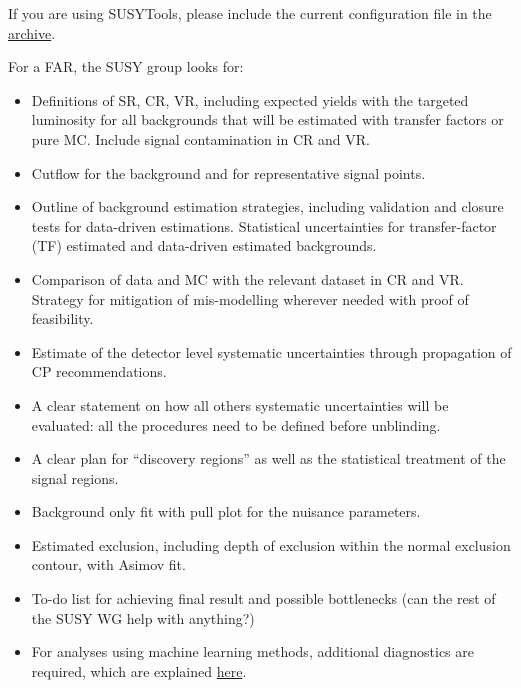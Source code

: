 If you are using SUSYTools, please include the current configuration file in the \href{http://gitlab.cern.ch/atlas-phys-susy-wg/AnalysisSUSYToolsConfigurations}{archive}.

For a FAR, the SUSY group looks for:
\begin{itemize}
\item Definitions of SR, CR, VR, including expected yields with the targeted luminosity for all backgrounds that will be estimated with transfer factors or pure MC\@.
    Include signal contamination in CR and VR\@.
\item Cutflow for the background and for representative signal points.
\item Outline of background estimation strategies, including validation and closure tests for data-driven estimations. Statistical uncertainties for transfer-factor (TF) estimated and data-driven estimated backgrounds.
\item Comparison of data and MC with the relevant dataset in CR and VR\@. Strategy for mitigation of mis-modelling wherever needed with proof of feasibility.
\item Estimate of the detector level systematic uncertainties through propagation of CP recommendations.
\item A clear statement on how all others systematic uncertainties will be evaluated: all the procedures need to be defined before unblinding.
\item A clear plan for ``discovery regions'' as well as the statistical treatment of the signal regions.
\item Background only fit with pull plot for the nuisance parameters.
\item Estimated exclusion, including depth of exclusion within the normal exclusion contour, with Asimov fit.
\item To-do list for achieving final result and possible bottlenecks (can the rest of the SUSY WG help with anything?)
\item For analyses using machine learning methods, additional diagnostics are required, which are explained \href{https://twiki.cern.ch/twiki/bin/view/AtlasProtected/SusyMachineLearning}{here}.
\end{itemize}

